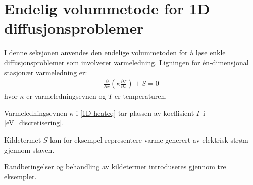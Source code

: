 \section{Endelig volummetode for 1D diffusjonsproblemer}\label{sect:evm1d}
I denne seksjonen anvendes den endelige volummetoden for å løse enkle diffusjonsproblemer som involverer varmeledning. Ligningen for én-dimensjonal stasjonær varmeledning er:
\begin{align}\label{1D-heateq}
\frac{\partial}{\partial x} \left( \kappa \frac{\partial T}{\partial x} \right) + S = 0
\end{align}
hvor $\kappa$ er varmeledningsevnen og $T$ er temperaturen.
\begin{rem}{}
Varmeledningsevnen $\kappa$ i \eqref{1D-heateq} tar plassen av koeffisient $\Gamma$ i \eqref{eV_discretisering}.

Kildetermet $S$ kan for eksempel representere varme generert av elektrisk strøm gjennom staven.
\end{rem}
 Randbetingelser og behandling av kildetermer introduseres gjennom tre eksempler.

